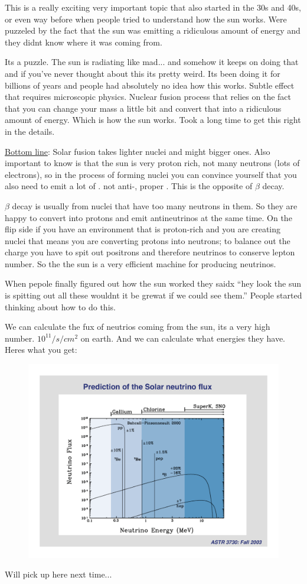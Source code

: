 {This is a really exciting very important topic that also started in the 30s and 40s, or even way before when people tried to understand how the sun works.
Were puzzeled by the fact that the sun was emitting a ridiculous amount of energy and they didnt know where it was coming from. 

Its a puzzle. 
The sun is radiating like mad... and somehow it keeps on doing that and if you've never thought about this its pretty weird. 
Its been doing it for billions of years and people had absolutely no idea how this works.  
Subtle effect that requires microscopic physics.  
Nuclear fusion process that relies on the fact that you can change your mass a little bit and convert that into a ridiculous amount of energy.
Which is how the sun works. 
Took a long time to get this right in the details. 


\underline{Bottom line}: Solar fusion takes lighter nuclei and might bigger ones.
Also important to know is that the sun is very proton rich, not many neutrons (lots of electrons), so in the process of forming nuclei you can convince yourself that you also need to emit a lot of \nus. 
not anti-\nus, proper \nus.   
This is the opposite of $\beta$ decay. 

$\beta$ decay is usually from nuclei that have too many neutrons in them. 
So they are happy to convert into protons and emit antineutrinos at the same time. 
On the flip side if you have an environment that is proton-rich and you are creating nuclei that means you are converting protons into neutrons; to balance out the charge you have to spit out positrons and therefore neutrinos to conserve lepton number. 
So the the sun is a very efficient machine for producing neutrinos. 

When pepole finally figured out how the sun worked they saidx ``hey look the sun is spitting out all these \nus wouldnt it be grewat if we could see them.''
People started thinking about how to do this. 

We can calculate the fux of neutrios coming from the sun,  its a very high number. $10^{11}/s/cm^2$ on earth. 
And we can calculate what energies they have.  
Heres what you get:

\begin{figure}[h!]
\centering
\includegraphics[width=1.0\textwidth]{./NuFromSun.pdf}
\end{figure}

Will pick up here next time...



}



